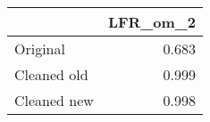 \begin{tabular}{lr}
\toprule
{} & LFR_om_2 \\
\midrule
Original    &    0.683 \\
Cleaned old &    0.999 \\
Cleaned new &    0.998 \\
\bottomrule
\end{tabular}
